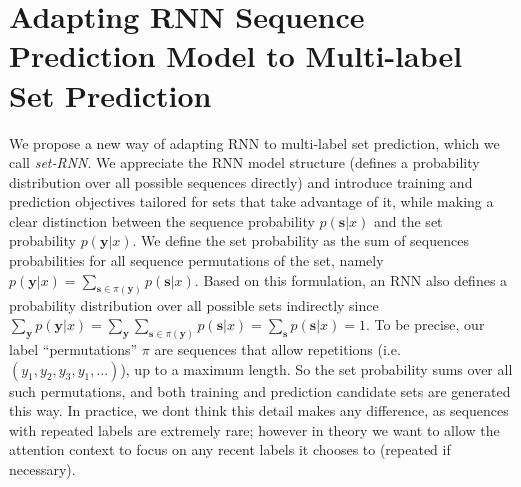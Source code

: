 
\section{Adapting RNN Sequence Prediction Model to Multi-label Set Prediction}
\label{sec:Model}

We propose a new way of adapting RNN to multi-label set prediction, which we call \emph{set-RNN}. We appreciate the RNN model structure (defines a probability distribution over all possible sequences directly) and introduce training and prediction objectives tailored for sets that take advantage of it, while making a clear distinction between the sequence probability $p(\mathbf{s}|x)$ and the set probability $p(\mathbf{y}|x)$. 
  We define the set probability as the sum of sequences probabilities for all sequence permutations of the set, namely $p(\mathbf{y}|x)=\sum_{\mathbf{s}\in \pi(\mathbf{y})} p(\mathbf{s}|x)$. Based on this formulation, an RNN also defines a probability distribution over all possible sets indirectly since $\sum_{\mathbf{y}} p(\mathbf{y}|x)=\sum_{\mathbf{y}}\sum_{\mathbf{s}\in \pi(\mathbf{y})} p(\mathbf{s}|x)=\sum_{\mathbf{s}} p(\mathbf{s}|x)=1$.   
  To be precise, our label ``permutations'' $\pi$ are sequences that allow repetitions (i.e. $(y_1,y_2,y_3,y_1,...)$), up to a maximum length. So the set probability sums over all such permutations, and both training and prediction candidate sets are generated this way. In practice, we dont think this detail makes any difference, as sequences with repeated labels are extremely rare; however in theory we want to allow the attention context to focus on any recent labels it chooses to (repeated if necessary).
  
